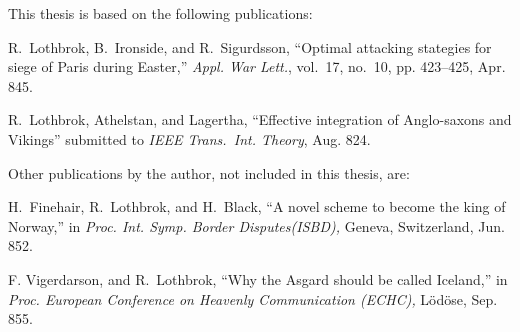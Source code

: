 
This thesis is based on the following publications:

\bigskip %
[A] R.~Lothbrok, B.~Ironside, and R.~Sigurdsson, ``Optimal attacking stategies for siege of Paris during Easter,'' \emph{Appl. War Lett.}, vol.~17, no.~10, pp. 423--425, Apr.
  845.

\bigskip
[B]  R.~Lothbrok, Athelstan, and  Lagertha, ``Effective integration of Anglo-saxons and Vikings'' submitted to \emph{IEEE Trans.\ Int. Theory}, Aug. 824. 

\bigskip
Other publications by the author, not included in this thesis, are:

\bigskip
[C] H.~Finehair, R.~Lothbrok, and H.~Black, ``A novel scheme to become the king of Norway,'' in \emph{Proc. Int. Symp. Border Disputes(ISBD),} Geneva, Switzerland, Jun. 852.
 
\bigskip
[D] F. Vigerdarson, and R.~Lothbrok, ``Why the Asgard should be called Iceland,'' in \emph{Proc. European Conference on Heavenly Communication (ECHC),} L\"{o}d\"{o}se, Sep. 855.